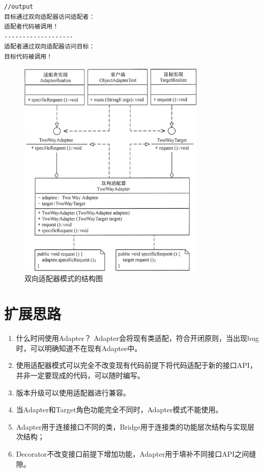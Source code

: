 \begin{lstlisting}
//output
目标通过双向适配器访问适配者：
适配者代码被调用！
-------------------
适配者通过双向适配器访问目标：
目标代码被调用！
\end{lstlisting}
\begin{figure}[!h]
	\centering
	\includegraphics[width=0.8\textwidth]{image/2-3}
	\caption{双向适配器模式的结构图}
\end{figure}
\section{扩展思路}
\begin{enumerate}
	\item 什么时间使用Adapter？
	\subitem Adapter会将现有类适配，符合开闭原则，当出现bug时，可以明确知道不在现有Adaptee中。
	\item 使用适配器模式可以完全不改变现有代码前提下将代码适配于新的接口API，并非一定要现成的代码，可以随时编写。
	\item 版本升级可以使用适配器进行兼容。
	\item 当Adapter和Target角色功能完全不同时，Adapter模式不能使用。
	\item Adapter用于连接接口不同的类，Bridge用于连接类的功能层次结构与实现层次结构；
	\item Decorator不改变接口前提下增加功能，Adapter用于填补不同接口API之间缝隙。
\end{enumerate}

